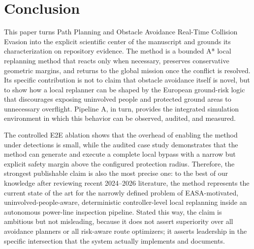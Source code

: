 \documentclass[a4paper,11pt]{article}
\begin{document}
\section{Conclusion}

This paper turns Path Planning and Obstacle Avoidance Real-Time Collision Evasion into the explicit scientific center of the manuscript and grounds its characterization on repository evidence. The method is a bounded A* local replanning method that reacts only when necessary, preserves conservative geometric margins, and returns to the global mission once the conflict is resolved. Its specific contribution is not to claim that obstacle avoidance itself is novel, but to show how a local replanner can be shaped by the European ground-risk logic that discourages exposing uninvolved people and protected ground areas to unnecessary overflight. Pipeline A, in turn, provides the integrated simulation environment in which this behavior can be observed, audited, and measured.

The controlled E2E ablation shows that the overhead of enabling the method under detections is small, while the audited case study demonstrates that the method can generate and execute a complete local bypass with a narrow but explicit safety margin above the configured protection radius. Therefore, the strongest publishable claim is also the most precise one: to the best of our knowledge after reviewing recent 2024--2026 literature, the method represents the current state of the art for the narrowly defined problem of EASA-motivated, uninvolved-people-aware, deterministic controller-level local replanning inside an autonomous power-line inspection pipeline. Stated this way, the claim is ambitious but not misleading, because it does not assert superiority over all avoidance planners or all risk-aware route optimizers; it asserts leadership in the specific intersection that the system actually implements and documents.

\printbibliography
\end{document}
